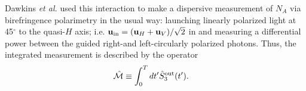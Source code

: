 \documentclass[preprint,aps,pra,onecolumn]{revtex4-1} %
\newcommand{\inp}{{\rm in}}
\begin{document}
Dawkins {\em et al.} \cite{dawkins_dispersive_2011} used this interaction to make a dispersive measurement of $N_A$ via birefringence polarimetry in the usual way:  launching linearly polarized light at 45$^\circ$ to the quasi-$H$ axis; i.e. $\mbf{u}_\inp = (\mbf{u}_H + \mbf{u}_V )/\sqrt{2}$ in  and measuring  a differential power between the guided right-and left-circularly polarized photons. 
Thus, the integrated measurement is described by the operator
\begin{align} \label{Eq::MeasOpAtomCounting}
		\hat{\mathcal{M}} & \equiv \int_0^T dt' \hat{S}^{\rm out}_3(t').
\end{align} 
\end{document}
